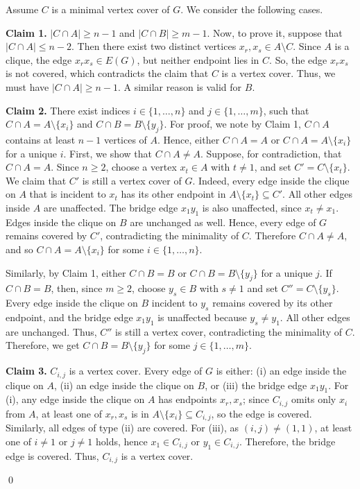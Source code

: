 \documentclass[12pt]{article}
\renewenvironment{proof}{{\noindent\bfseries Proof.}}{\qed}
\theoremstyle{plain}
\theoremstyle{definition}
\newcommand{\A}{A}
\newcommand{\B}{B}
\begin{document}
	\begin{proof} Assume $C$ is a minimal vertex cover of $G$. We consider the following cases.
		
		\smallskip\noindent
		\textbf{Claim 1.} $|C\cap \A|\ge n-1$ and $|C\cap \B|\ge m-1$.
		Now, to prove it, suppose that $|C\cap \A|\le n-2$. Then there exist two distinct vertices $x_r,x_s\in \A\setminus C$.
		Since $\A$ is a clique, the edge $x_rx_s\in E(G)$, but neither endpoint lies in $C$. So, the edge $x_rx_s$ is not covered, which contradicts the claim that $C$ is a vertex cover. Thus, we must have $|C\cap \A|\ge n-1$. A similar reason is valid for  $\B$. 
		
		\smallskip\noindent
		\textbf{Claim 2.} There exist indices $i\in\{1,\dots,n\}$ and $j\in\{1,\dots,m\}$, such that
		 $C\cap \A=\A\setminus\{x_i\}$ and $C\cap \B=\B\setminus\{y_j\}.$  For proof, we note by Claim 1, $C\cap \A$ contains at least $n-1$ vertices of $\A$. Hence,  either $C\cap \A=\A$ or $C\cap \A=\A\setminus\{x_i\}$ for a unique $i$.
		 First, we show that $C\cap \A\neq \A$. Suppose, for contradiction, that $C\cap \A=\A$. Since $n\ge 2$, choose a vertex $x_t\in \A$ with $t\neq 1$, and set $C'=C\setminus\{x_t\}$. We claim that $C'$ is still a vertex cover of $G$.
		 Indeed, every edge inside the clique on $\A$ that is incident to $x_t$ has its other endpoint in $\A\setminus\{x_t\}\subseteq C'$. All other edges inside $\A$ are unaffected. The bridge edge $x_1y_1$ is also unaffected, since $x_t\neq x_1$. Edges inside the clique on $\B$ are unchanged as well. Hence, every edge of $G$ remains covered by $C'$, contradicting the minimality of $C$. Therefore $C\cap \A\neq \A$, and so
		$
		C\cap \A=\A\setminus\{x_i\}
		$ 	for some $i\in\{1,\dots,n\}$.
		
		Similarly, by Claim 1, either $C\cap \B=\B$ or $C\cap \B=\B\setminus\{y_j\}$ for a unique $j$. If $C\cap \B=\B$, then, since $m\ge 2$, choose $y_s\in \B$ with $s\neq 1$ and set $C''=C\setminus\{y_s\}$. Every edge inside the clique on $\B$ incident to $y_s$ remains covered by its other endpoint, and the bridge edge $x_1y_1$ is unaffected because $y_s\neq y_1$. All other edges are unchanged. Thus, $C''$ is still a vertex cover, contradicting the minimality of $C$. Therefore, we get 
		$
		C\cap \B=\B\setminus\{y_j\}
		$
		for some $j\in\{1,\dots,m\}$. 
		
		\smallskip\noindent
		\textbf{Claim 3.} $C_{i,j}$ is a vertex cover. Every edge of $G$ is either:
		(i) an edge inside the clique on $\A$,
		(ii) an edge inside the clique on $\B$, or
		(iii) the bridge edge $x_1y_1$.
		For (i), any edge inside the clique on $\A$ has endpoints $x_r,x_s$; since $C_{i,j}$ omits only $x_i$ from $\A$,
		at least one of $x_r,x_s$ is in $\A\setminus\{x_i\}\subseteq C_{i,j}$, so the edge is covered.
		Similarly, all edges of type (ii) are covered.
		For (iii), as $(i,j)\neq(1,1)$, at least one of $i\neq 1$ or $j\neq 1$ holds, hence $x_1\in C_{i,j}$ or $y_1\in C_{i,j}$.
		Therefore, the bridge edge is covered. Thus, $C_{i,j}$ is a vertex cover. 
		

\end{proof}
\end{document}
